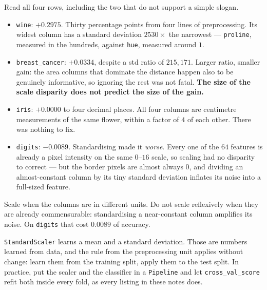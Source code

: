 \documentclass[11pt]{article}
\begin{document}
Read all four rows, including the two that do not support a simple slogan.

\begin{itemize}[leftmargin=*]
  \item \texttt{wine}: $+0.2975$. Thirty percentage points from four lines of
    preprocessing. Its widest column has a standard deviation $2530\times$ the
    narrowest --- \texttt{proline}, measured in the hundreds, against
    \texttt{hue}, measured around $1$.
  \item \texttt{breast\_cancer}: $+0.0334$, despite a std ratio of
    $215{,}171$. Larger ratio, smaller gain: the area columns that dominate the
    distance happen also to be genuinely informative, so ignoring the rest was
    not fatal. \textbf{The size of the scale disparity does not predict the
    size of the gain.}
  \item \texttt{iris}: $+0.0000$ to four decimal places. All four columns are
    centimetre measurements of the same flower, within a factor of $4$ of each
    other. There was nothing to fix.
  \item \texttt{digits}: $-0.0089$. Standardising made it \emph{worse}. Every
    one of the $64$ features is already a pixel intensity on the same $0$--$16$
    scale, so scaling had no disparity to correct --- but the border pixels are
    almost always $0$, and dividing an almost-constant column by its tiny
    standard deviation inflates its noise into a full-sized feature.
\end{itemize}

\begin{keyidea}
Scale when the columns are in different units. Do not scale reflexively when
they are already commensurable: standardising a near-constant column amplifies
its noise. On \texttt{digits} that cost $0.0089$ of accuracy.
\end{keyidea}

\begin{caution}
\texttt{StandardScaler} learns a mean and a standard deviation. Those are
numbers learned from data, and the rule from the preprocessing unit applies
without change: learn them from the training split, apply them to the test
split. In practice, put the scaler and the classifier in a
\texttt{Pipeline} and let \texttt{cross\_val\_score} refit both inside every
fold, as every listing in these notes does.
\end{caution}

\end{document}
